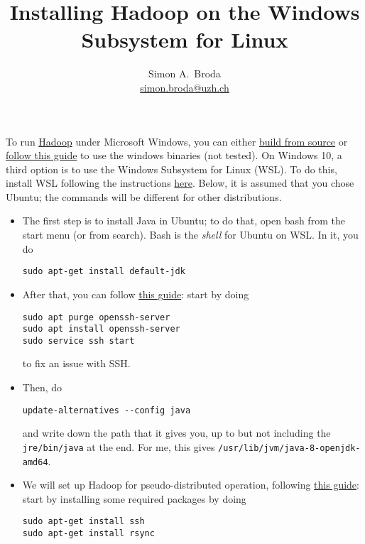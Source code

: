 \documentclass[11pt,a4paper]{article}
\title{Installing Hadoop on the Windows Subsystem for Linux}
\author{Simon A.\ Broda\\\href{mailto:simon.broda@uzh.ch}{simon.broda@uzh.ch}}
\begin{document}
\maketitle
To run \href{https://hadoop.apache.org/}{Hadoop} under Microsoft Windows, you can either \href{https://wiki.apache.org/hadoop/Hadoop2OnWindows}{build from source} or \href{https://github.com/MuhammadBilalYar/Hadoop-On-Window/wiki/Step-by-step-Hadoop-2.8.0-installation-on-Window-10}{follow this guide} to use the windows binaries (not tested). On Windows 10, a third option is to use the Windows Subsystem for Linux (WSL).
To do this, install WSL following the instructions  \href{https://docs.microsoft.com/en-us/windows/wsl/install-win10}{here}. Below, it is assumed that you chose Ubuntu; the commands will be different for other distributions.
\begin{itemize}
\item The first step is to install Java in Ubuntu; to do that, open bash from the start menu (or from search). Bash is the \emph{shell} for Ubuntu on WSL. In it, you do

\verb+sudo apt-get install default-jdk+

\item After that, you can follow \href{https://jonboulineau.me/blog/hadoop/hadoop-on-wsl}{this guide}: start by doing
\begin{verbatim}
sudo apt purge openssh-server
sudo apt install openssh-server
sudo service ssh start
\end{verbatim}
to fix an issue with SSH. 

\item Then, do

\verb+update-alternatives --config java+

and write down the path that it gives you, up to but not including the \verb+jre/bin/java+ at the end. For me, this gives \verb+/usr/lib/jvm/java-8-openjdk-amd64+.

\item We will set up Hadoop for pseudo-distributed operation, following \href{https://hadoop.apache.org/docs/stable/hadoop-project-dist/hadoop-common/SingleCluster.html}{this guide}: start by installing some required packages by doing
\begin{verbatim}
sudo apt-get install ssh
sudo apt-get install rsync
\end{verbatim}


\end{itemize}
\end{document}
